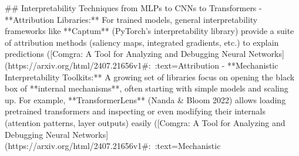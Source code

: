 ## Interpretability Techniques from MLPs to CNNs to Transformers
- **Attribution Libraries:** For trained models, general interpretability frameworks like **Captum** (PyTorch’s interpretability library) provide a suite of attribution methods (saliency maps, integrated gradients, etc.) to explain predictions ([Comgra: A Tool for Analyzing and Debugging Neural Networks](https://arxiv.org/html/2407.21656v1#:~:text=Attribution%
- **Mechanistic Interpretability Toolkits:** A growing set of libraries focus on opening the black box of **internal mechanisms**, often starting with simple models and scaling up. For example, **TransformerLens** (Nanda & Bloom 2022) allows loading pretrained transformers and inspecting or even modifying their internals (attention patterns, layer outputs) easily ([Comgra: A Tool for Analyzing and Debugging Neural Networks](https://arxiv.org/html/2407.21656v1#:~:text=Mechanistic%
